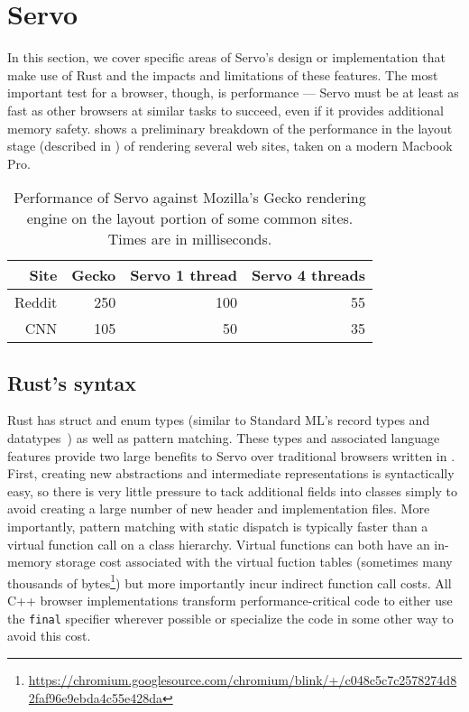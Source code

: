\section{Servo}
\label{sec:servo}
In this section, we cover specific areas of Servo's design or implementation that make use of Rust
and the impacts and limitations of these features.
The most important test for a browser, though, is performance --- Servo must be at least as fast
as other browsers at similar tasks to succeed, even if it provides additional memory safety.
 shows a preliminary breakdown of the performance in the layout stage (described
in ) of rendering several web sites, taken on a modern Macbook Pro.
\begin{table}
  \begin{center}
    \begin{tabular}{r || r | r | r}
      Site & Gecko & Servo 1 thread & Servo 4 threads \\
      \hline
      Reddit & 250 & 100 & 55  \\
      CNN & 105 & 50 & 35 \\
    \end{tabular}%
  \end{center}%
  \caption{Performance of Servo against Mozilla's Gecko rendering engine on the layout portion of some common sites.
  Times are in milliseconds.}
  \label{servo-perf}
\end{table}

\subsection{Rust's syntax}
Rust has struct and enum types (similar to Standard ML's record types and datatypes~\cite{sml97-definition}) as
well as pattern matching.
These types and associated language features provide two large benefits to Servo over traditional browsers
written in \Cplusplus{}.
First, creating new abstractions and intermediate representations is syntactically easy, so there is very little
pressure to tack additional fields into classes simply to avoid creating a large number of new header and implementation
files.
More importantly, pattern matching with static dispatch is typically faster than a virtual function call on a class
hierarchy.
Virtual functions can both have an in-memory storage cost associated with the virtual fuction tables (sometimes many thousands of bytes\footnote{\url{https://chromium.googlesource.com/chromium/blink/+/c048c5c7c2578274d82faf96e9ebda4c55e428da}}) but more importantly
incur indirect function call costs.
All C++ browser implementations transform performance-critical code to either use the \lstinline[language=C]{final}
specifier wherever possible or specialize the code in some other way to avoid this cost.

